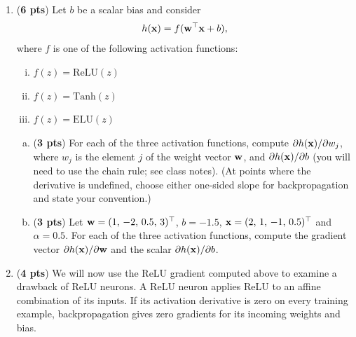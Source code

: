 \documentclass[11pt]{exam}
\begin{document}
\begin{enumerate}[1.]
\clearpage
\item (\textbf{6 pts}) Let $b$ be a scalar bias and consider
\[
h({\bf x}) = f({\bf w}^\top {\bf x} + b),
\]
where $f$ is one of the following activation functions:
\begin{enumerate}[(i)]
    \item $f(z) = \text{ReLU}(z)$
    \item $f(z) = \text{Tanh}(z)$
    \item $f(z) = \text{ELU}(z)$
\end{enumerate}
\begin{enumerate}[(a)]
    \item ({\bf 3 pts}) For each of the three activation functions, compute $\partial h({\bf x})/\partial w_j$, where $w_j$ is the element $j$ of the weight vector ${\bf w}$, and $\partial h({\bf x})/\partial b$
    (you will need to use the chain rule; see class notes).
    (At points where the derivative is undefined, choose either one-sided slope for backpropagation and state your convention.)
    \begin{tcolorbox}
\vspace{50ex}
\end{tcolorbox}
\newpage
    \item ({\bf 3 pts}) Let ${\bf w} = (1,\, -2,\, 0.5,\, 3)^\top$, $b = -1.5$, ${\bf x} = (2,\, 1,\, -1,\, 0.5)^\top$ and $\alpha = 0.5$. For each of the three activation functions, compute the gradient vector $\partial h({\bf x})/\partial {\bf w}$ and the scalar $\partial h({\bf x})/\partial b$.
    \begin{tcolorbox}
\vspace{50ex}
\end{tcolorbox}
\end{enumerate}


\newpage
 \item ({\bf 4 pts}) We will now use the ReLU gradient computed above to examine a drawback of ReLU neurons. A ReLU neuron applies ReLU to an affine combination of its inputs. If its activation derivative is zero on every training example, backpropagation gives zero gradients for its incoming weights and bias.


\end{enumerate}
\end{document}

